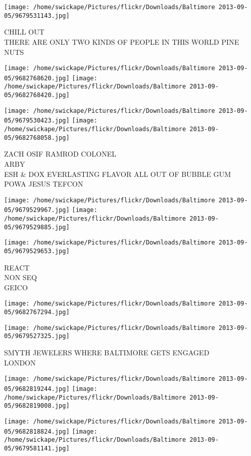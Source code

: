 \documentclass[10pt,letterpaper]{article}
\begin{document}
\vspace{0.25in}
\texttt{[image: /home/swickape/Pictures/flickr/Downloads/Baltimore 2013-09-05/9679531143.jpg]}

CHILL OUT\\
THERE ARE ONLY TWO KINDS OF PEOPLE IN THIS WORLD PINE NUTS
\pagebreak

\texttt{[image: /home/swickape/Pictures/flickr/Downloads/Baltimore 2013-09-05/9682768620.jpg]}
\texttt{[image: /home/swickape/Pictures/flickr/Downloads/Baltimore 2013-09-05/9682768420.jpg]}

\texttt{[image: /home/swickape/Pictures/flickr/Downloads/Baltimore 2013-09-05/9679530423.jpg]}
\texttt{[image: /home/swickape/Pictures/flickr/Downloads/Baltimore 2013-09-05/9682768058.jpg]}

ZACH OSIF RAMROD COLONEL\\
ARBY\\
ESH \& DOX EVERLASTING FLAVOR ALL OUT OF BUBBLE GUM\\
POWA JESUS TEFCON
\pagebreak

\texttt{[image: /home/swickape/Pictures/flickr/Downloads/Baltimore 2013-09-05/9679529967.jpg]}
\texttt{[image: /home/swickape/Pictures/flickr/Downloads/Baltimore 2013-09-05/9679529885.jpg]}

\vspace{0.25in}
\texttt{[image: /home/swickape/Pictures/flickr/Downloads/Baltimore 2013-09-05/9679529653.jpg]}

REACT\\
NON SEQ\\
GEICO
\pagebreak

\texttt{[image: /home/swickape/Pictures/flickr/Downloads/Baltimore 2013-09-05/9682767294.jpg]}

\vspace{0.25in}
\texttt{[image: /home/swickape/Pictures/flickr/Downloads/Baltimore 2013-09-05/9679527325.jpg]}

SMYTH JEWELERS WHERE BALTIMORE GETS ENGAGED\\
LONDON
\pagebreak

\texttt{[image: /home/swickape/Pictures/flickr/Downloads/Baltimore 2013-09-05/9682819244.jpg]}
\texttt{[image: /home/swickape/Pictures/flickr/Downloads/Baltimore 2013-09-05/9682819008.jpg]}

\texttt{[image: /home/swickape/Pictures/flickr/Downloads/Baltimore 2013-09-05/9682818824.jpg]}
\texttt{[image: /home/swickape/Pictures/flickr/Downloads/Baltimore 2013-09-05/9679581141.jpg]}
\end{document}

